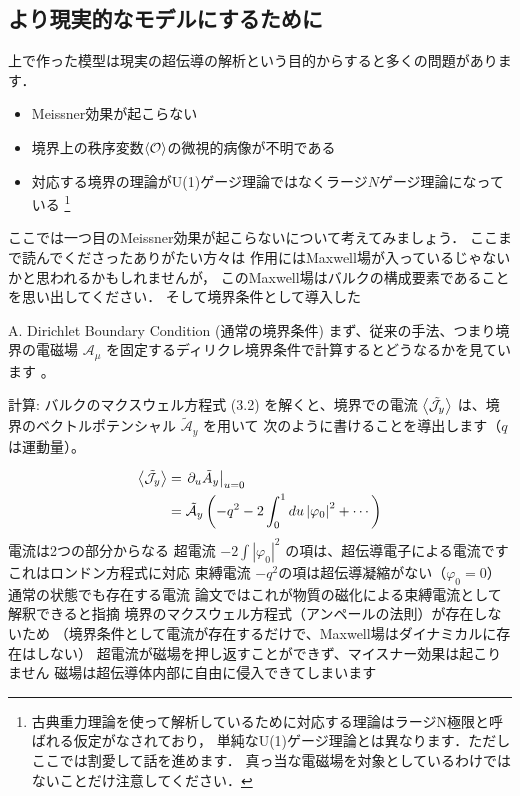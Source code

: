 \documentclass[b5paper,11pt,dvipdfmx]{jsarticle}
\numberwithin{equation}{section}
\theoremstyle{definition}
\begin{document}
\subsection{より現実的なモデルにするために}
上で作った模型は現実の超伝導の解析という目的からすると多くの問題があります．
\begin{itemize}
    \item Meissner効果が起こらない
    \item 境界上の秩序変数$\ev{\mathcal{O}}$の微視的病像が不明である
    \item 対応する境界の理論がU(1)ゲージ理論ではなくラージ$N$ゲージ理論になっている
    \footnote{古典重力理論を使って解析しているために対応する理論はラージN極限と呼ばれる仮定がなされており，
    単純なU(1)ゲージ理論とは異なります．ただしここでは割愛して話を進めます．
    真っ当な電磁場を対象としているわけではないことだけ注意してください．}
\end{itemize}
ここでは一つ目のMeissner効果が起こらないについて考えてみましょう．
ここまで読んでくださったありがたい方々は
作用にはMaxwell場が入っているじゃないかと思われるかもしれませんが，
このMaxwell場はバルクの構成要素であることを思い出してください．
そして境界条件として導入した

A. Dirichlet Boundary Condition (通常の境界条件)
まず、従来の手法、つまり境界の電磁場
$\mathcal{A}_\mu$ を固定するディリクレ境界条件で計算するとどうなるかを見ています 。


計算: バルクのマクスウェル方程式 (3.2)  を解くと、境界での電流
$\ev{\tilde{\mathcal{J}}_y}$ は、境界のベクトルポテンシャル $\tilde{\mathcal{A}}_y$ を用いて
次のように書けることを導出します（$q$ は運動量）。

\begin{equation}
    \begin{split}
        \ev{\tilde{\mathcal{J}}_y}& =\left.\partial_u \tilde{A}_y\right|_{u=0} \\
        & =\tilde{\mathcal{A}}_y\left(-q^2-2 \int_0^1 d u\left|\varphi_0\right|^2+\cdots\right)
    \end{split}
\end{equation}
電流は2つの部分からなる
超電流
$-2\int |\varphi_0|^2$ の項は、超伝導電子による電流ですこれはロンドン方程式に対応
束縛電流
$-q^2$の項は超伝導凝縮がない（$\varphi_0=0$）通常の状態でも存在する電流
論文ではこれが物質の磁化による束縛電流として解釈できると指摘
境界のマクスウェル方程式（アンペールの法則）が存在しないため
（境界条件として電流が存在するだけで、Maxwell場はダイナミカルに存在はしない）
超電流が磁場を押し返すことができず、マイスナー効果は起こりません
磁場は超伝導体内部に自由に侵入できてしまいます
\end{document}
